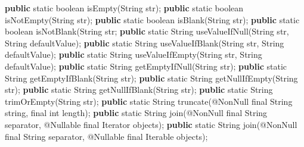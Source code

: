 \documentclass[
]{book}
\newenvironment{Shaded}{\begin{snugshade}}{\end{snugshade}}
\newcommand{\AttributeTok}[1]{\textcolor[rgb]{0.77,0.63,0.00}{#1}}
\newcommand{\BuiltInTok}[1]{#1}
\newcommand{\DataTypeTok}[1]{\textcolor[rgb]{0.13,0.29,0.53}{#1}}
\newcommand{\FunctionTok}[1]{\textcolor[rgb]{0.00,0.00,0.00}{#1}}
\newcommand{\KeywordTok}[1]{\textcolor[rgb]{0.13,0.29,0.53}{\textbf{#1}}}
\newcommand{\NormalTok}[1]{#1}
\begin{document}
\begin{Shaded}
\begin{Highlighting}[]
\KeywordTok{public} \DataTypeTok{static} \DataTypeTok{boolean} \FunctionTok{isEmpty}\NormalTok{(}\BuiltInTok{String}\NormalTok{ str);}
\KeywordTok{public} \DataTypeTok{static} \DataTypeTok{boolean} \FunctionTok{isNotEmpty}\NormalTok{(}\BuiltInTok{String}\NormalTok{ str);}
\KeywordTok{public} \DataTypeTok{static} \DataTypeTok{boolean} \FunctionTok{isBlank}\NormalTok{(}\BuiltInTok{String}\NormalTok{ str);}
\KeywordTok{public} \DataTypeTok{static} \DataTypeTok{boolean} \FunctionTok{isNotBlank}\NormalTok{(}\BuiltInTok{String}\NormalTok{ str;}
\KeywordTok{public} \DataTypeTok{static} \BuiltInTok{String} \FunctionTok{useValueIfNull}\NormalTok{(}\BuiltInTok{String}\NormalTok{ str, }\BuiltInTok{String}\NormalTok{ defaultValue);}
\KeywordTok{public} \DataTypeTok{static} \BuiltInTok{String} \FunctionTok{useValueIfBlank}\NormalTok{(}\BuiltInTok{String}\NormalTok{ str, }\BuiltInTok{String}\NormalTok{ defaultValue);}
\KeywordTok{public} \DataTypeTok{static} \BuiltInTok{String} \FunctionTok{useValueIfEmpty}\NormalTok{(}\BuiltInTok{String}\NormalTok{ str, }\BuiltInTok{String}\NormalTok{ defaultValue);}
\KeywordTok{public} \DataTypeTok{static} \BuiltInTok{String} \FunctionTok{getEmptyIfNull}\NormalTok{(}\BuiltInTok{String}\NormalTok{ str);}
\KeywordTok{public} \DataTypeTok{static} \BuiltInTok{String} \FunctionTok{getEmptyIfBlank}\NormalTok{(}\BuiltInTok{String}\NormalTok{ str);}
\KeywordTok{public} \DataTypeTok{static} \BuiltInTok{String} \FunctionTok{getNullIfEmpty}\NormalTok{(}\BuiltInTok{String}\NormalTok{ str);}
\KeywordTok{public} \DataTypeTok{static} \BuiltInTok{String} \FunctionTok{getNullIfBlank}\NormalTok{(}\BuiltInTok{String}\NormalTok{ str);}
\KeywordTok{public} \DataTypeTok{static} \BuiltInTok{String} \FunctionTok{trimOrEmpty}\NormalTok{(}\BuiltInTok{String}\NormalTok{ str);}
\KeywordTok{public} \DataTypeTok{static} \BuiltInTok{String} \FunctionTok{truncate}\NormalTok{(}\AttributeTok{@NonNull} \DataTypeTok{final} \BuiltInTok{String}\NormalTok{ string, }\DataTypeTok{final} \DataTypeTok{int}\NormalTok{ length);}
\KeywordTok{public} \DataTypeTok{static} \BuiltInTok{String} \FunctionTok{join}\NormalTok{(}\AttributeTok{@NonNull} \DataTypeTok{final} \BuiltInTok{String}\NormalTok{ separator, }\AttributeTok{@Nullable} \DataTypeTok{final} \BuiltInTok{Iterator}\NormalTok{ objects);}
\KeywordTok{public} \DataTypeTok{static} \BuiltInTok{String} \FunctionTok{join}\NormalTok{(}\AttributeTok{@NonNull} \DataTypeTok{final} \BuiltInTok{String}\NormalTok{ separator, }\AttributeTok{@Nullable} \DataTypeTok{final} \BuiltInTok{Iterable}\NormalTok{ objects);}

\end{Highlighting}
\end{Shaded}
\end{document}

